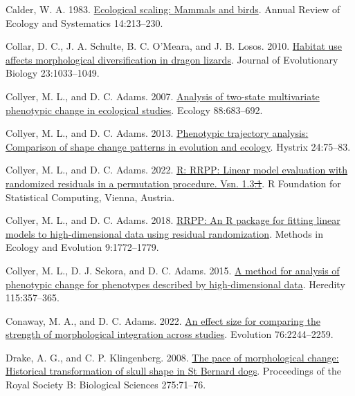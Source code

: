 \documentclass[
  11pt,
]{article}
\newlength{\cslhangindent}
\newlength{\cslentryspacingunit} %
\newenvironment{CSLReferences}[2] %
 {%
  \setlength{\parindent}{0pt}
  \ifodd #1
  \let\oldpar\par
  \def\par{\hangindent=\cslhangindent\oldpar}
  \fi
  \setlength{\parskip}{#2\cslentryspacingunit}
 }%
 {}
\providecommand{\DIFaddtex}[1]{{\protect\color{blue}\uwave{#1}}} %
\providecommand{\DIFdeltex}[1]{{\protect\color{red}\sout{#1}}}                      %
\providecommand{\DIFaddbegin}{} %
\providecommand{\DIFaddend}{} %
\providecommand{\DIFdelbegin}{} %
\providecommand{\DIFdelend}{} %
\providecommand{\DIFadd}[1]{\texorpdfstring{\DIFaddtex{#1}}{#1}} %
\providecommand{\DIFdel}[1]{\texorpdfstring{\DIFdeltex{#1}}{}} %
\newcommand{\DIFscaledelfig}{0.5}
\newlength{\DIFdelgraphicswidth} %
\newlength{\DIFdelgraphicsheight} %
\newcommand{\DIFaddincludegraphics}[2][]{{\color{blue}\fbox{\DIFOincludegraphics[#1]{#2}}}} %
\newcommand{\DIFdelincludegraphics}[2][]{%
\sbox{\DIFdelgraphicsbox}{\DIFOincludegraphics[#1]{#2}}%
\settoboxwidth{\DIFdelgraphicswidth}{\DIFdelgraphicsbox} %
\settoboxtotalheight{\DIFdelgraphicsheight}{\DIFdelgraphicsbox} %
\scalebox{\DIFscaledelfig}{%
\parbox[b]{\DIFdelgraphicswidth}{\usebox{\DIFdelgraphicsbox}\\[-\baselineskip] \rule{\DIFdelgraphicswidth}{0em}}\llap{\resizebox{\DIFdelgraphicswidth}{\DIFdelgraphicsheight}{%
\setlength{\unitlength}{\DIFdelgraphicswidth}%
\begin{picture}(1,1)%
\thicklines\linethickness{2pt} %
{\color[rgb]{1,0,0}\put(0,0){\framebox(1,1){}}}%
{\color[rgb]{1,0,0}\put(0,0){\line( 1,1){1}}}%
{\color[rgb]{1,0,0}\put(0,1){\line(1,-1){1}}}%
\end{picture}%
}\hspace*{3pt}}} %
} %
\DeclareRobustCommand{\DIFaddbegin}{\DIFOaddbegin \let\includegraphics\DIFaddincludegraphics} %
\DeclareRobustCommand{\DIFaddend}{\DIFOaddend \let\includegraphics\DIFOincludegraphics} %
\DeclareRobustCommand{\DIFdelbegin}{\DIFOdelbegin \let\includegraphics\DIFdelincludegraphics} %
\DeclareRobustCommand{\DIFdelend}{\DIFOaddend \let\includegraphics\DIFOincludegraphics} %
\begin{document}
\begin{CSLReferences}{1}{0}
\leavevmode{}%
Calder, W. A. 1983.
\href{https://doi.org/10.1146/annurev.es.14.110183.001241}{Ecological
scaling: Mammals and birds}. Annual Review of Ecology and Systematics
14:213--230.

\leavevmode{}%
Collar, D. C., J. A. Schulte, B. C. O'Meara, and J. B. Losos. 2010.
\href{https://doi.org/10.1111/j.1420-9101.2010.01971.x}{Habitat use
affects morphological diversification in dragon lizards}. Journal of
Evolutionary Biology 23:1033--1049.

\leavevmode{}%
Collyer, M. L., and D. C. Adams. 2007.
\href{https://doi.org/10.1890/06-0727}{Analysis of two-state
multivariate phenotypic change in ecological studies}. Ecology
88:683--692.

\leavevmode{}%
Collyer, M. L., and D. C. Adams. 2013.
\href{https://doi.org/10.4404/hystrix-24.1-6298}{Phenotypic trajectory
analysis: Comparison of shape change patterns in evolution and ecology}.
Hystrix 24:75--83.

\leavevmode{}%
Collyer, M. L., and D. C. Adams. 2022.
\href{https://CRAN.R-project.org/package=RRPP}{R: RRPP: Linear model
evaluation with randomized residuals in a permutation procedure. Vsn.
1.3\DIFdelbegin \DIFdel{.1}\DIFdelend \DIFaddbegin \DIFadd{.2}\DIFaddend }. R Foundation for Statistical Computing, Vienna, Austria.

\leavevmode{}%
Collyer, M. L., and D. C. Adams. 2018.
\href{https://doi.org/10.1111/2041-210X.13029}{RRPP: An {R} package for
fitting linear models to high-dimensional data using residual
randomization}. Methods in Ecology and Evolution 9:1772--1779.

\leavevmode{}%
Collyer, M. L., D. J. Sekora, and D. C. Adams. 2015.
\href{https://doi.org/10.1038/hdy.2014.75}{A method for analysis of
phenotypic change for phenotypes described by high-dimensional data}.
Heredity 115:357--365.

\leavevmode{}%
Conaway, M. A., and D. C. Adams. 2022.
\href{https://doi.org/10.1111/evo.14595}{An effect size for comparing
the strength of morphological integration across studies}. Evolution
76:2244--2259.

\leavevmode{}%
Drake, A. G., and C. P. Klingenberg. 2008.
\href{https://doi.org/10.1098/rspb.2007.1169}{The pace of morphological
change: Historical transformation of skull shape in {S}t {B}ernard
dogs}. Proceedings of the Royal Society B: Biological Sciences
275:71--76.


\end{CSLReferences}
\end{document}

